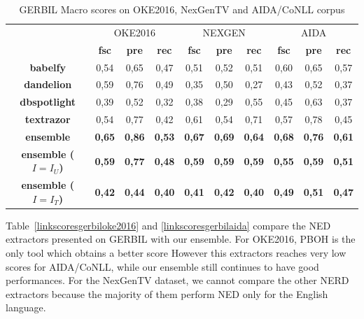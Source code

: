 \documentclass{llncs}
\newcommand{\tabref}[1]{\mbox{Table~\ref{#1}}}
\begin{document}
\begin{table}[p]
      \centering
      \setlength{\tabcolsep}{5pt}
        \begin{tabular}{c|c|c|c|c|c|c|c|c|c|}
          \multicolumn{1}{c}{ } &
          \multicolumn{3}{|c|}{OKE2016} & 
          \multicolumn{3}{|c|}{NEXGEN} &
          \multicolumn{3}{|c|}{AIDA}\\
           \multicolumn{1}{c|}{ } & \textbf{fsc} & \textbf{pre} & \textbf{rec}
           & \textbf{fsc} & \textbf{pre} & \textbf{rec} & \textbf{fsc} & \textbf{pre} & \textbf{rec} \\ \hline
            \textbf{babelfy}         & 0,54  & 0,65   & 0,47  & 0,51  & 0,52 & 0,51 & 0,60  & 0,65 & 0,57 \\ \hline
            \textbf{dandelion}       & 0,59   & 0,76   & 0,49 & 0,35  & 0,50  & 0,27 & 0,43  & 0,52 & 0,37 \\ \hline
            \textbf{dbspotlight}     & 0,39   & 0,52   & 0,32 & 0,38   & 0,29  & 0,55  & 0,45  & 0,63 & 0,37\\ \hline
            \textbf{textrazor}       & 0,54   & 0,77   & 0,42 & 0,61  & 0,54  & 0,71 & 0,57  & 0,78 & 0,45\\ \hline \hline
            \textbf{ensemble}        & \textbf{0,65}   & \textbf{0,86}   & \textbf{0,53}  & \textbf{0,67} & \textbf{0,69}  & \textbf{0,64} & \textbf{0,68}   & \textbf{0,76}   & \textbf{0,61} \\ \hline
            \textbf{ensemble ($I=I_U$)}        & \textbf{0,59}   & \textbf{0,77}   & \textbf{0,48}  & \textbf{0,59} & \textbf{0,59}  & \textbf{0,59} & \textbf{0,55}   & \textbf{0,59}   & \textbf{0,51}\\ \hline
            \textbf{ensemble ($I=I_T$)}        & \textbf{0,42} & \textbf{0,44}  & \textbf{0,40}  & \textbf{0,41} & \textbf{0,42}  & \textbf{0,40} & \textbf{0,49}   & \textbf{0,51}   & \textbf{0,47}\\ \hline
        \end{tabular}
    \caption{GERBIL Macro scores on OKE2016, NexGenTV and AIDA/CoNLL corpus}
    \label{linkscoresmacro}
\end{table}


\tabref{linkscoresgerbiloke2016} and \ref{linkscoresgerbilaida} compare the NED extractors presented on GERBIL with our ensemble. For OKE2016, PBOH is the only tool which obtains a better score However this extractors reaches very low scores for AIDA/CoNLL, while our ensemble still continues to have good performances.
For the NexGenTV dataset, we cannot compare the other NERD extractors because the majority of them perform NED only for the English language.
\end{document}
